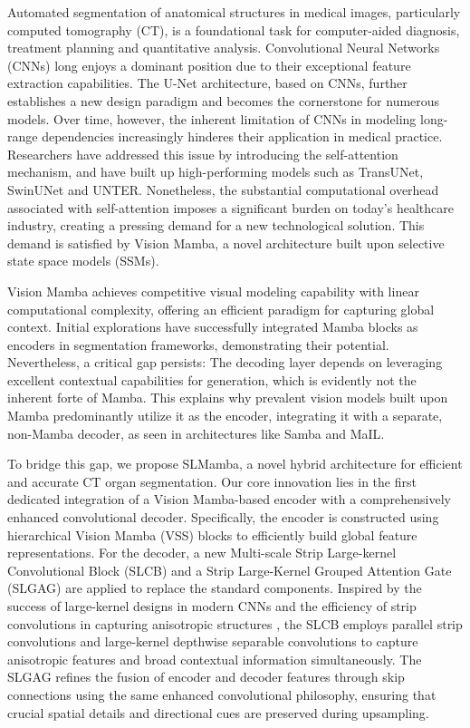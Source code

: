 \documentclass[runningheads]{llncs}
\begin{document}
Automated segmentation of anatomical structures in medical images, particularly computed tomography (CT), is a foundational task for computer-aided diagnosis, treatment planning and quantitative analysis\cite{ronneberger2015unet,milletari2016vnet,isensee2021nnu}. Convolutional Neural Networks (CNNs) long enjoys a dominant position due to their exceptional feature extraction capabilities. The U-Net architecture, based on CNNs, further establishes a new design paradigm and becomes the cornerstone for numerous models. Over time, however, the inherent limitation of CNNs in modeling long-range dependencies increasingly hinderes their application in medical practice. Researchers have addressed this issue by introducing the self-attention mechanism, and have built up high-performing models such as TransUNet\cite{chen2021transunet}, SwinUNet\cite{cao2021swinunet} and UNTER\cite{hatamizadeh2022unetr}. Nonetheless, the substantial computational overhead associated with self-attention imposes a significant burden on today's healthcare industry, creating a pressing demand for a new technological solution. This demand is satisfied by Vision Mamba, a novel architecture built upon selective state space models (SSMs)\cite{gu2023mamba,liu2024vmamba,zhu2024vim}.

Vision Mamba achieves competitive visual modeling capability with linear computational complexity, offering an efficient paradigm for capturing global context. Initial explorations have successfully integrated Mamba blocks as encoders in segmentation frameworks\cite{ruan2024vmunet,ma2024umamba}, demonstrating their potential. Nevertheless, a critical gap persists: The decoding layer depends on leveraging excellent contextual capabilities for generation, which is evidently not the inherent forte of Mamba. This explains why prevalent vision models built upon Mamba predominantly utilize it as the encoder, integrating it with a separate, non-Mamba decoder, as seen in architectures like Samba\cite{Smamba} and MaIL\cite{MaIL}.

To bridge this gap, we propose SLMamba, a novel hybrid architecture for efficient and accurate CT organ segmentation. Our core innovation lies in the first dedicated integration of a Vision Mamba-based encoder with a comprehensively enhanced convolutional decoder. Specifically, the encoder is constructed using hierarchical Vision Mamba (VSS) blocks to efficiently build global feature representations. For the decoder, a new Multi-scale Strip Large-kernel Convolutional Block (SLCB) and a Strip Large-Kernel Grouped Attention Gate (SLGAG) are applied to replace the standard components. Inspired by the success of large-kernel designs in modern CNNs \cite{liu2022convnext} and the efficiency of strip convolutions in capturing anisotropic structures \cite{hou2020strippooling}, the SLCB employs parallel strip convolutions and large-kernel depthwise separable convolutions to capture anisotropic features and broad contextual information simultaneously. The SLGAG refines the fusion of encoder and decoder features through skip connections using the same enhanced convolutional philosophy, ensuring that crucial spatial details and directional cues are preserved during upsampling.
\end{document}

